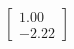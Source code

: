 \documentclass[preview]{standalone}
\begin{document}
\begin{align*}
\begin{bmatrix} 1.00 \\ -2.22 \end{bmatrix}
\end{align*}
\end{document}
